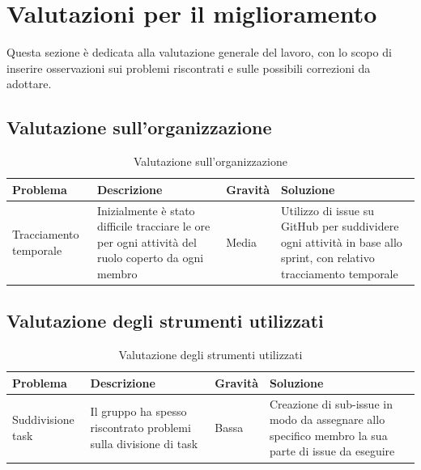 \documentclass[a4paper,10pt]{article}
\begin{document}
\section{Valutazioni per il miglioramento}
Questa sezione è dedicata alla valutazione generale del lavoro, con lo scopo di inserire osservazioni sui problemi riscontrati e sulle possibili correzioni da adottare.
\subsection{Valutazione sull'organizzazione}
\begin{table}[H]
\centering
\renewcommand{\arraystretch}{1.2}
\begin{tabular}{|p{3cm}|p{4cm}|p{2cm}|p{4cm}|}
\hline
\textbf{Problema} & \textbf{Descrizione} & \textbf{Gravità} & \textbf{Soluzione} \\
\hline
Tracciamento temporale &
Inizialmente è stato difficile tracciare le ore per ogni attività del ruolo coperto da ogni membro &
Media &
Utilizzo di issue su GitHub per suddividere ogni attività in base allo sprint, con relativo tracciamento temporale \\
\hline
\end{tabular}
\caption{Valutazione sull’organizzazione}
\label{tab:valutazione-organizzazione}
\end{table}

\subsection{Valutazione degli strumenti utilizzati}
\begin{table}[H]
\centering
\renewcommand{\arraystretch}{1.2}
\begin{tabular}{|p{3cm}|p{4cm}|p{2cm}|p{4cm}|}
\hline
\textbf{Problema} & \textbf{Descrizione} & \textbf{Gravità} & \textbf{Soluzione} \\
\hline
Suddivisione task &
Il gruppo ha spesso riscontrato problemi sulla divisione di task &
Bassa &
Creazione di sub-issue in modo da assegnare allo specifico membro la sua parte di issue da eseguire \\
\hline
\end{tabular}
\caption{Valutazione degli strumenti utilizzati}
\label{tab:valutazione-strmenti}
\end{table}
\end{document}
